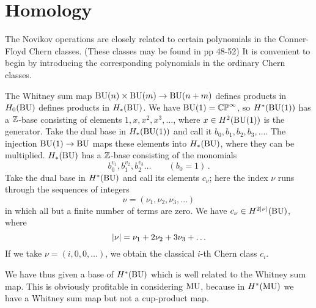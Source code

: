 \documentclass[../main]{subfiles}
\begin{document}
\chapter{Homology}
\label{sec:p1c3}

The Novikov operations are closely related to certain polynomials in the Conner-Floyd Chern classes. 
(These classes may be found in \cite{connerfloyd} pp 48-52) 
It is convenient to begin by introducing the corresponding polynomials in the ordinary Chern classes.

The Whitney sum map $\mathrm{BU}(n) \times \mathrm{BU}(m) \to \mathrm{BU}(n+m)$ defines products in $H_{0}(\operatorname{BU})$ defines products in $H_{ \ast}(\operatorname{BU})$.
We have $\mathrm{BU}(1) = \mathbb{CP}^{\infty}$, so $H^*(\mathrm{BU}(1))$ has a $\mathbb{Z}$-base consisting of elements $1, x, x^{2}, x^{3}, \ldots$, where $x \in H^{2}(\mathrm{BU}(1))$ is the generator. 
Take the dual base in $H_{\ast}(\mathrm{BU}(1))$ and call it $b_0, b_1, b_2, b_3, \ldots$.
The injection $\mathrm{BU}(1) \to \operatorname{BU}$ maps these elements into $H_{\ast}(\operatorname{BU})$, where they can be multiplied. 
$H_{\ast}(\operatorname{BU})$ has a $\mathbb{Z}$-base consisting of the monomials 
\begin{equation*}
	b_0^{v_1},b_1^{v_2},b_2^{v_3}\ldots \qquad (b_0=1)\,.
\end{equation*}
Take the dual base in $H^*(\operatorname{BU})$ and call its elements $c_{\nu}$; here the index $\nu$ runs through the sequences of integers 
\begin{equation*}
	\nu = (\nu_1, \nu_2, \nu_3, \ldots)
\end{equation*}
in which all but a finite number of terms are zero. 
We have $c_{\nu}\in H^{2\lvert\nu\rvert}(\operatorname{BU})$, where 
\begin{equation*}
	\lvert\nu\rvert = \nu_1 + 2\nu_2+ 3\nu_3+ \ldots
\end{equation*} 
If we take $\nu = (i, 0, 0, \ldots)$, we obtain the classical $i$-th Chern class $c_{i}$. %

We have thus given a base of $H^*(\operatorname{BU})$ which is well related to the Whitney sum map. 
This is obviously profitable in considering $\operatorname{MU}$, because in $H^*(\operatorname{MU})$ we have a Whitney sum map but not a cup-product map. 
\end{document}
